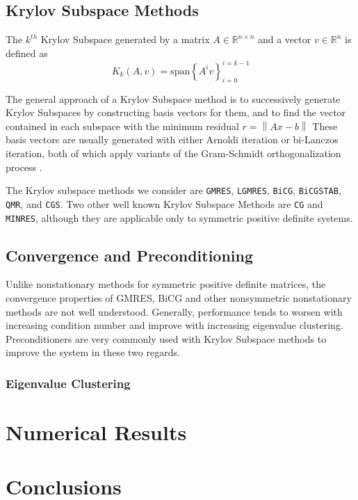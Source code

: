 \documentclass[10pt]{article}
\newcommand\norm[1]{\left\lVert #1 \right\rVert}
\begin{document}
\begin{multicols}{2}
\subsection{Krylov Subspace Methods}

The $k^{th}$ Krylov Subspace generated by a matrix $A \in \mathbb{R}^{n\times n}$ and a vector $v \in \mathbb{R}^n$ is defined as
\begin{equation}
	K_k(A,v) = \mbox{span}\left\{A^iv\right\}_{i=0}^{i=k-1}
\end{equation}

The general approach of a Krylov Subspace method is to successively generate Krylov Subspaces by constructing basis vectors for them, and to find the vector contained in each subspace with the minimum residual $r = \norm{Ax-b}$
These basis vectors are usually generated with either Arnoldi iteration or bi-Lanczos iteration, both of which apply variants of the Gram-Schmidt orthogonalization process \citep{ghai_comparison_2016}.

The Krylov subspace methods we consider are \texttt{GMRES}, \texttt{LGMRES}, \texttt{BiCG}, \texttt{BiCGSTAB}, \texttt{QMR}, and \texttt{CGS}.
Two other well known Krylov Subspace Methods are \texttt{CG} and \texttt{MINRES}, although they are applicable only to symmetric positive definite systems.

\subsection{Convergence and Preconditioning}
Unlike nonstationary methods for symmetric positive definite matrices, the convergence properties of GMRES, BiCG and other nonsymmetric nonstationary methods are not well understood.
Generally, performance tends to worsen with increasing condition number and improve with increasing eigenvalue clustering.
Preconditioners are very commonly used with Krylov Subspace methods to improve the system in these two regards.

\subsubsection{Eigenvalue Clustering}

\section{Numerical Results}

\section{Conclusions}



\end{multicols}
\end{document}
